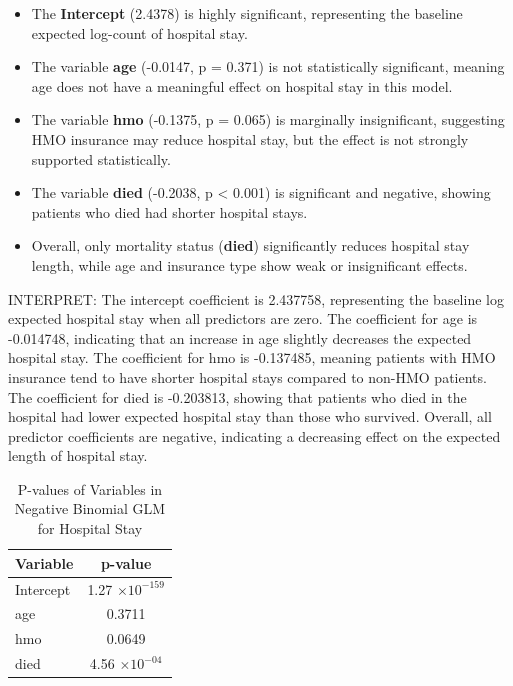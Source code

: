 \documentclass[12pt,a4paper]{report}
\begin{document}
\begin{tcolorbox}[colback=blue!5!white,colframe=blue!70!black,title=Interpretation]
\begin{itemize}
    \item The \textbf{Intercept} (2.4378) is highly significant, representing the baseline expected log-count of hospital stay.
    \item The variable \textbf{age} (-0.0147, p = 0.371) is not statistically significant, meaning age does not have a meaningful effect on hospital stay in this model.
    \item The variable \textbf{hmo} (-0.1375, p = 0.065) is marginally insignificant, suggesting HMO insurance may reduce hospital stay, but the effect is not strongly supported statistically.
    \item The variable \textbf{died} (-0.2038, p < 0.001) is significant and negative, showing patients who died had shorter hospital stays.
    \item Overall, only mortality status (\textbf{died}) significantly reduces hospital stay length, while age and insurance type show weak or insignificant effects.
\end{itemize}
\end{tcolorbox}
INTERPRET:
The intercept coefficient is 2.437758, representing the baseline log expected hospital stay when all predictors are zero.
The coefficient for age is -0.014748, indicating that an increase in age slightly decreases the expected hospital stay.
The coefficient for hmo is -0.137485, meaning patients with HMO insurance tend to have shorter hospital stays compared to non-HMO patients.
The coefficient for died is -0.203813, showing that patients who died in the hospital had lower expected hospital stay than those who survived.
Overall, all predictor coefficients are negative, indicating a decreasing effect on the expected length of hospital stay.
\begin{table}[h!]
\centering
\begin{tabular}{|l|c|}
\hline
\textbf{Variable} & \textbf{p-value} \\ \hline
Intercept & 1.27 $\times 10^{-159}$ \\ \hline
age       & 0.3711 \\ \hline
hmo       & 0.0649 \\ \hline
died      & 4.56 $\times 10^{-04}$ \\ \hline
\end{tabular}
\caption{P-values of Variables in Negative Binomial GLM for Hospital Stay}
\label{tab:pvalues_nb_stay}
\end{table}
\end{document}
